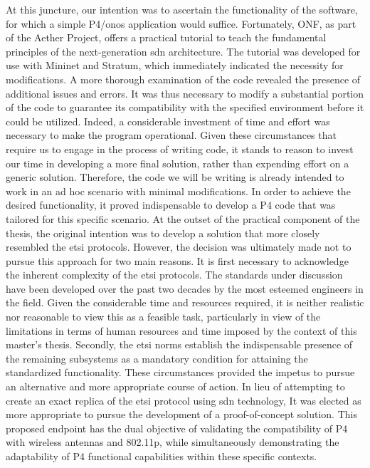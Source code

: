 At this juncture, our intention was to ascertain the functionality of the software, for which a simple P4/\gls{onos} application would suffice. Fortunately, ONF, as part of the Aether Project, offers a practical tutorial to teach the fundamental principles of the next-generation \gls{sdn} architecture. The tutorial was developed for use with Mininet and Stratum, which immediately indicated the necessity for modifications. A more thorough examination of the code revealed the presence of additional issues and errors. It was thus necessary to modify a substantial portion of the code to guarantee its compatibility with the specified environment before it could be utilized. Indeed, a considerable investment of time and effort was necessary to make the program operational. Given these circumstances that require us to engage in the process of writing code, it stands to reason to invest our time in developing a more final solution, rather than expending effort on a generic solution. Therefore, the code we will be writing is already intended to work in an ad hoc scenario with minimal modifications.
In order to achieve the desired functionality, it proved indispensable to develop a P4 code that was tailored for this specific scenario. At the outset of the practical component of the thesis, the original intention was to develop a solution that more closely resembled the \gls{etsi} protocols. However, the decision was ultimately made not to pursue this approach for two main reasons. It is first necessary to acknowledge the inherent complexity of the \gls{etsi} protocols. The standards under discussion have been developed over the past two decades by the most esteemed engineers in the field. Given the considerable time and resources required, it is neither realistic nor reasonable to view this as a feasible task, particularly in view of the limitations in terms of human resources and time imposed by the context of this master's thesis. Secondly, the \gls{etsi} norms establish the indispensable presence of the remaining subsystems as a mandatory condition for attaining the standardized functionality. These circumstances provided the impetus to pursue an alternative and more appropriate course of action. 
In lieu of attempting to create an exact replica of the \gls{etsi} protocol using \gls{sdn} technology, It was elected as more appropriate to pursue the development of a proof-of-concept solution. This proposed endpoint has the dual objective of validating the compatibility of P4 with wireless antennas and 802.11p, while simultaneously demonstrating the adaptability of P4 functional capabilities within these specific contexts. 
